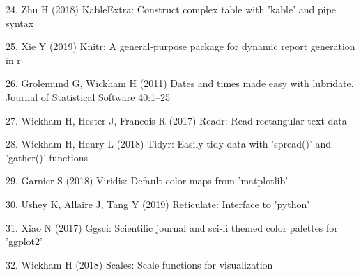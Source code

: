 \documentclass[11pt,]{article}
\begin{document}
\leavevmode\hypertarget{ref-kableExtra}{}%
24. Zhu H (2018) KableExtra: Construct complex table with 'kable' and
pipe syntax

\leavevmode\hypertarget{ref-knitr1}{}%
25. Xie Y (2019) Knitr: A general-purpose package for dynamic report
generation in r

\leavevmode\hypertarget{ref-lubridate}{}%
26. Grolemund G, Wickham H (2011) Dates and times made easy with
lubridate. Journal of Statistical Software 40:1--25

\leavevmode\hypertarget{ref-readr}{}%
27. Wickham H, Hester J, Francois R (2017) Readr: Read rectangular text
data

\leavevmode\hypertarget{ref-tidyr}{}%
28. Wickham H, Henry L (2018) Tidyr: Easily tidy data with 'spread()'
and 'gather()' functions

\leavevmode\hypertarget{ref-viridis}{}%
29. Garnier S (2018) Viridis: Default color maps from 'matplotlib'

\leavevmode\hypertarget{ref-reticulate}{}%
30. Ushey K, Allaire J, Tang Y (2019) Reticulate: Interface to 'python'

\leavevmode\hypertarget{ref-ggsci}{}%
31. Xiao N (2017) Ggsci: Scientific journal and sci-fi themed color
palettes for 'ggplot2'

\leavevmode\hypertarget{ref-scales}{}%
32. Wickham H (2018) Scales: Scale functions for visualization
\end{document}
